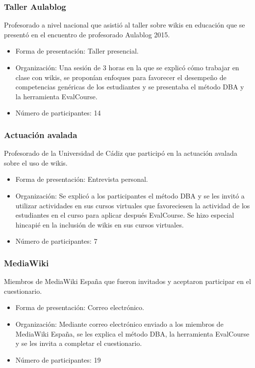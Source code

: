\subsubsection{Taller Aulablog}
Profesorado a nivel nacional que asistió al taller sobre wikis en educación que se presentó en el encuentro de profesorado Aulablog 2015.

	\begin{itemize}
		\item{Forma de presentación:} Taller presencial.

		\item{Organización:} Una sesión de 3 horas en la que se explicó cómo trabajar en clase con wikis, se proponían enfoques para favorecer el desempeño de competencias genéricas de los estudiantes y se presentaba el método DBA y la herramienta EvalCourse.

		\item{Número de participantes:} 14
	\end{itemize}

\subsubsection{Actuación avalada}
Profesorado de la Universidad de Cádiz que participó en la actuación avalada sobre el uso de wikis.

	\begin{itemize}
		\item{Forma de presentación:} Entrevista personal.

		\item{Organización:} Se explicó a los participantes el método DBA y se les invitó a utilizar actividades en sus cursos virtuales que favoreciesen la actividad de los estudiantes en el curso para aplicar después EvalCourse. Se hizo especial hincapié en la inclusión de wikis en sus cursos virtuales. 

		\item{Número de participantes:} 7
	\end{itemize}

\subsubsection{MediaWiki}
Miembros de MediaWiki España que fueron invitados y aceptaron participar en el cuestionario.

	\begin{itemize}
		\item{Forma de presentación:} Correo electrónico.

		\item{Organización:} Mediante correo electrónico enviado a los miembros de MediaWiki España, se les explica el método DBA, la herramienta EvalCourse y se les invita a completar el cuestionario.

		\item{Número de participantes:} 19 %
	\end{itemize}

